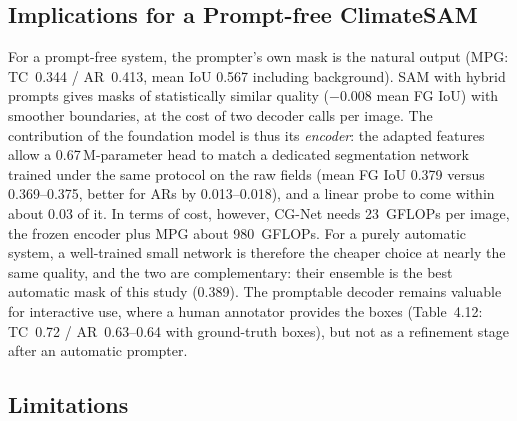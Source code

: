 \subsection{Implications for a Prompt-free ClimateSAM}

For a prompt-free system, the prompter's own mask is the natural output (MPG: TC~0.344 / AR~0.413, mean IoU 0.567
including background). SAM with hybrid prompts gives masks of statistically similar quality ($-0.008$ mean FG IoU) with
smoother boundaries, at the cost of two decoder calls per image. The contribution of the foundation model is thus its
\emph{encoder}: the adapted features allow a 0.67\,M-parameter head to match a dedicated segmentation network trained
under the same protocol on the raw fields (mean FG IoU 0.379 versus 0.369--0.375, better for ARs by 0.013--0.018), and
a linear probe to come within about 0.03 of it. In terms of cost, however, CG-Net needs 23~GFLOPs per image, the frozen
encoder plus MPG about 980~GFLOPs. For a purely automatic system, a well-trained small network is therefore the cheaper
choice at nearly the same quality, and the two are complementary: their ensemble is the best automatic mask of this
study (0.389). The promptable decoder remains valuable for interactive use,
where a human annotator provides the boxes (Table~4.12: TC~0.72 / AR~0.63--0.64 with ground-truth boxes), but not as a
refinement stage after an automatic prompter.

\subsection{Limitations}

